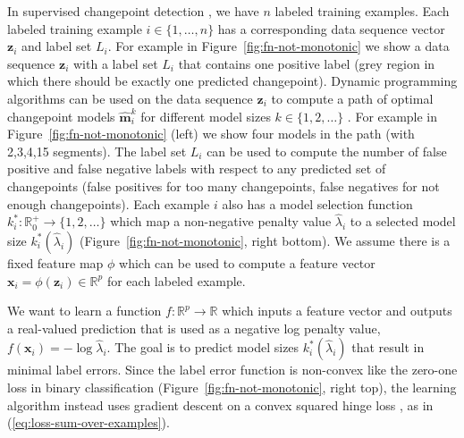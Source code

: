 \documentclass{article}
\begin{document}
In supervised changepoint detection \citep{Hocking2013icml}, we have  $n$ labeled training examples. 
Each labeled training example $i\in\{1,\dots,n\}$ has a corresponding data sequence vector $\mathbf z_i$ and label set $L_i$.
For example in Figure~\ref{fig:fn-not-monotonic} we show a data sequence $\mathbf z_i$ with a label set $L_i$ that contains one positive label (grey region in which there should be exactly one predicted changepoint).
Dynamic programming algorithms can be used on the data sequence $\mathbf z_i$ to compute a path of optimal changepoint models $\mathbf {\hat m}^k_i$ for different model sizes $k\in\{1,2,\dots\}$  \citep{Maidstone2016}.
For example in Figure~\ref{fig:fn-not-monotonic} (left) we show four models in the path (with 2,3,4,15 segments).
The label set $L_i$ can be used to compute the number of false positive and false negative labels with respect to any predicted set of changepoints (false positives for too many changepoints, false negatives for not enough changepoints).
Each example $i$ also has a model selection function $k^*_i:\mathbb R^+_0 \rightarrow \{1,2,\dots\}$ which map a non-negative penalty value $\hat \lambda_i$ to a selected model size $k^*_i(\hat \lambda_i)$ (Figure~\ref{fig:fn-not-monotonic}, right bottom).
We assume there is a fixed feature map $\phi$ which can be used to compute a feature vector $\mathbf x_i = \phi(\mathbf z_i)\in\mathbb R^p$ for each labeled example.

We want to learn a function $f:\mathbb R^p\rightarrow \mathbb R$ which inputs a feature vector and outputs a real-valued prediction that is used as a negative log penalty value, $f(\mathbf x_i) = -\log \hat \lambda_i$.
The goal is to predict model sizes $k^*_i(\hat \lambda_i)$ that result in minimal label errors. 
Since the label error function is non-convex like the zero-one loss in binary classification (Figure~\ref{fig:fn-not-monotonic}, right top), the learning algorithm instead uses gradient descent on a convex squared hinge loss \citep{Hocking2013icml}, as in (\ref{eq:loss-sum-over-examples}).
\end{document}

